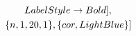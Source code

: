 \documentclass[11pt]{article}
\begin{document}
\begin{itemize}
\[\begin{array}{l}
                      \vspace{1mm}
\\  
  
\qquad \qquad  \qquad \qquad 

  LabelStyle  \rightarrow   Bold],
  
                        \vspace{1mm}
\\  
\qquad \qquad \qquad

 \{n, 1, 20, 1  \},
 \{cor, LightBlue\}]
 
 
   \end{array}
\]

 

   
   










 

  \end{itemize}
  
\pagebreak 
  
\end{document}
